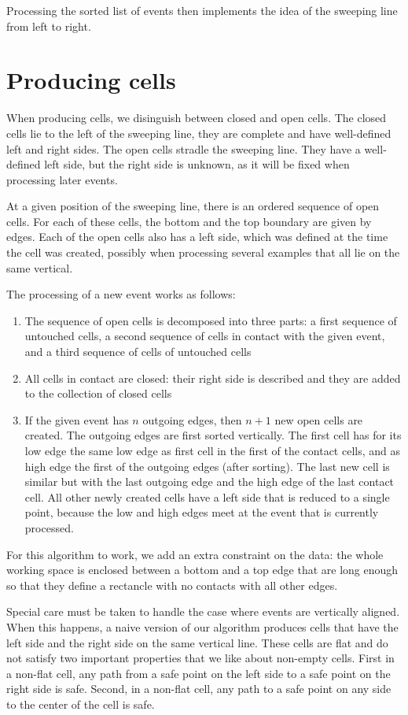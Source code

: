 \documentclass{easychair}
\begin{document}
Processing the sorted list of events then implements the idea of the
sweeping line from left to right.

\section{Producing cells}
When producing cells, we disinguish between closed and open cells.
The closed cells lie to the left of the sweeping line, they are
complete and have well-defined left and right sides.  The open cells
stradle the sweeping line.  They have a well-defined left side,
but the right side is unknown, as it will be fixed when
processing later events.

At a given position of the sweeping line, there is an ordered sequence
of open cells.  For each of these cells, the bottom and the top
boundary are given by edges.  Each of the open cells also has a
left side, which was defined at the time the cell was created,
possibly when processing several examples that all lie on the same
vertical.

The processing of a new event works as follows:
\begin{enumerate}
\item The sequence of open cells is decomposed into three parts:
a first sequence of untouched cells, a second sequence of cells in
contact with the given event, and a third sequence of cells of
untouched cells
\item All cells in contact are closed: their right side is
  described and they are added to the collection of closed cells
\item If the given event has \(n\) outgoing edges, then \(n+1\) new
  open cells are created.  The outgoing edges are first sorted vertically.
  The first cell has for its low edge the
  same low edge as first cell in the first of the contact cells, and
  as high edge the first of the outgoing edges (after sorting).  The
  last new cell is similar but with the last outgoing edge and the
  high edge of the last contact cell.  All other newly created cells have a
  left side that is reduced to a single point, because the low and
  high edges meet at the event that is currently processed.
\end{enumerate}
For this algorithm to work, we add an extra constraint on the data:
the whole working space is enclosed between a bottom and a top edge
that are long enough so that they define a rectancle with no contacts
with all other edges.

Special care must be taken to handle the case where events are
vertically aligned.  When this happens, a naive version of our
algorithm produces cells that have the left side and the right side on the
same vertical line.  These cells are flat and do not satisfy two important
properties that we like about non-empty cells.  First in a non-flat cell,
any path from a safe point on the left side to a safe point on the
right side is safe.  Second, in a non-flat cell, any path to a safe
point on any side to the center of the cell is safe.
\end{document}
